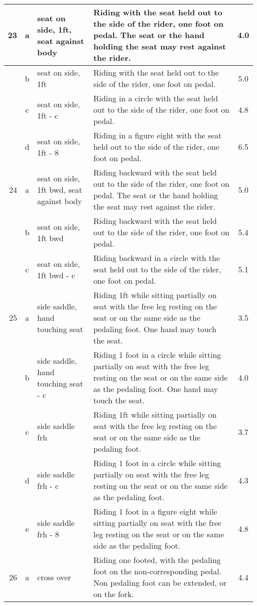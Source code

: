 \begin{longtable}{|r|c|p{4cm}|p{8cm}|c|}
\hline
23  & a & seat on side, 1ft, seat against body  & Riding with the seat held out to the side of the rider, one foot on pedal. The seat or the hand holding the seat may rest against the rider.  & 4.0 \\ 
\hline
  & b & seat on side, 1ft & Riding with the seat held out to the side of the rider, one foot on pedal.  & 5.0 \\ 
\hline
  & c & seat on side, 1ft - c & Riding in a circle with the seat held out to the side of the rider, one foot on pedal.  & 4.8 \\ 
\hline
  & d & seat on side, 1ft - 8 & Riding in a figure eight with the seat held out to the side of the rider, one foot on pedal.  & 6.5 \\ 
\hline
24  & a & seat on side, 1ft bwd, seat against body  & Riding backward with the seat held out to the side of the rider, one foot on pedal. The seat or the hand holding the seat may rest against the rider. & 5.0 \\ 
\hline
  & b & seat on side, 1ft bwd & Riding backward with the seat held out to the side of the rider, one foot on pedal. & 5.4 \\ 
\hline
  & c & seat on side, 1ft bwd - c & Riding backward in a circle with the seat held out to the side of the rider, one foot on pedal. & 5.1 \\ 
\hline
25  & a & side saddle, hand touching seat & Riding 1ft while sitting partially on seat with the free leg resting on the seat or on the same side as the pedaling foot. One hand may touch the seat. & 3.5 \\ 
\hline
  & b & side saddle, hand touching seat - c & Riding 1 foot in a circle while sitting partially on seat with the free leg resting on the seat or on the same side as the pedaling foot. One hand may touch the seat.  & 4.0 \\ 
\hline
  & c & side saddle frh & Riding 1ft while sitting partially on seat with the free leg resting on the seat or on the same side as the pedaling foot.  & 3.7 \\ 
\hline
  & d & side saddle frh - c & Riding 1 foot in a circle while sitting partially on seat with the free leg resting on the seat or on the same side as the pedaling foot. & 4.3 \\ 
\hline
  & e & side saddle frh - 8 & Riding 1 foot in a figure eight while sitting partially on seat with the free leg resting on the seat or on the same side as the pedaling foot. & 4.8 \\ 
\hline
26  & a & cross over  & Riding one footed, with the pedaling foot on the non-corresponding pedal. Non pedaling foot can be extended, or on the fork.  & 4.4 \\ 

\end{longtable}
